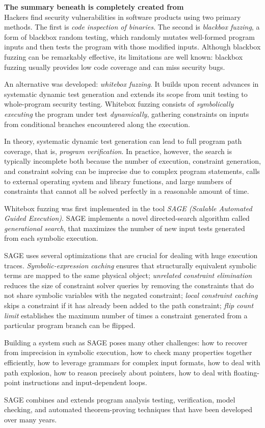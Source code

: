 \textbf{The summary beneath is completely created from \cite{godefroid2012sage}}
\\

Hackers find security vulnerabilities in software products using two primary methods. The first is \textit{code inspection of binaries}. The second is \textit{blackbox fuzzing}, a form of blackbox random testing, which randomly mutates well-formed program inputs and then tests the program with those modified inputs.
Although blackbox fuzzing can be remarkably effective, its limitations are well known: blackbox fuzzing usually provides low code coverage and can miss security bugs.

An alternative was developed: \textit{whitebox fuzzing}. It builds upon recent advances in systematic dynamic test generation and extends its scope from unit testing to whole-program security testing.
Whitebox fuzzing consists of \textit{symbolically executing} the program under test \textit{dynamically}, gathering constraints on inputs from conditional branches encountered along the execution.

In theory, systematic dynamic test generation can lead to full program path coverage, that is, \textit{program verification}. In practice, however, the search is typically incomplete both because the number of execution, constraint generation, and constraint solving can be imprecise due to complex program statements, calls to external operating system and library functions, and large numbers of constraints that cannot all be solved perfectly in a reasonable amount of time.

Whitebox fuzzing was first implemented in the tool \textit{SAGE (Scalable Automated Guided Execution)}. SAGE implements a novel directed-search algorithm called \textit{generational search}, that maximizes the number of new input tests generated from each symbolic execution.

SAGE uses several optimizations that are crucial for dealing with huge execution traces.
\textit{Symbolic-expression caching} ensures that structurally equivalent symbolic terms are mapped to the same physical object; \textit{unrelated constraint elimination} reduces the size of constraint solver queries by removing the constraints that do not share symbolic variables with the negated constraint; \textit{local constraint caching} skips a constraint if it has already been added to the path constraint; \textit{flip count limit} establishes the maximum number of times a constraint generated from a particular program branch can be flipped.

Building a system such as SAGE poses many other challenges: how to recover from imprecision in symbolic execution, how to check many properties together efficiently, how to leverage grammars for complex input formats, how to deal with path explosion, how to reason precisely about pointers, how to deal with floating-point instructions and input-dependent loops.

SAGE combines and extends program analysis testing, verification, model checking, and automated theorem-proving techniques that have been developed over many years.